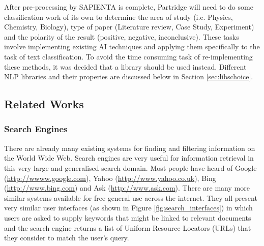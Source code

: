 \documentclass[12pt,a4paper]{article}
\begin{document}
After pre-processing by SAPIENTA is complete, Partridge will need to do some
classification work of its own to determine the area of study (i.e. Physics,
Chemistry, Biology), type of paper (Literature review, Case Study, Experiment)
and the polarity of the result (positive, negative, inconclusive). These tasks
involve implementing existing AI techniques and applying them specifically to
the task of text classification. To avoid the time consuming task of re-implementing these
methods, it was decided that a library should be used instead. Different NLP
libraries and their properies are discussed below in Section
\ref{sec:libschoice}.


\subsection{Related Works}
\label{sec:prior_art}

\subsubsection{Search Engines}
There are already many existing systems for finding and filtering information
on the World Wide Web. Search engines are very useful for information retrieval
in this very large and generalised search domain. Most people have heard of
Google (\url{http://wwww.google.com}), Yahoo (\url{http://www.yahoo.co.uk}),
Bing (\url{http://www.bing.com}) and Ask (\url{http://www.ask.com}). There are
many more similar systems available for free general use across the internet.
They all present very similar user interfaces (as shown in Figure
\ref{fig:search_interfaces}) in which users are asked to supply keywords that
might be linked to relevant documents and the search engine returns a list of
Uniform Resource Locators (URLs) that they consider to match the user's query.
\end{document}
